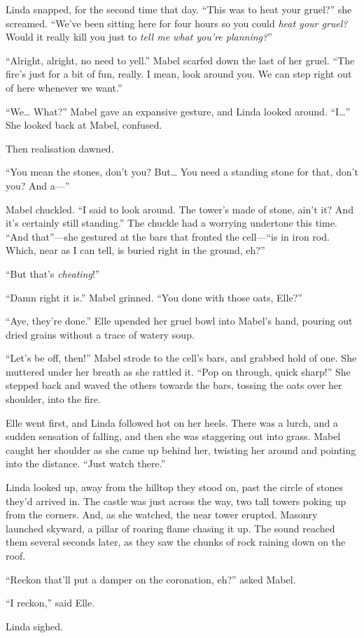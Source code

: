 Linda snapped, for the second time that day.
``This was to heat your gruel?'' she screamed.
``We've been sitting here for four hours so you could \emph{heat your gruel?}
Would it really kill you just to \emph{tell me what you're planning?}''

``Alright, alright, no need to yell.''
Mabel scarfed down the last of her gruel.
``The fire's just for a bit of fun, really.
I mean, look around you.
We can step right out of here whenever we want.''

``We{\dots}
What?''
Mabel gave an expansive gesture, and Linda looked around.
``I{\dots}''
She looked back at Mabel, confused.


Then realisation dawned.

``You mean the stones, don't you?
But{\dots}
You need a standing stone for that, don't you?
And a---''

Mabel chuckled.
``I said to look around.
The tower's made of stone, ain't it?
And it's certainly still standing.''
The chuckle had a worrying undertone this time.
``And that''---she gestured at the bars that fronted the cell---``is in iron rod.
Which, near as I can tell, is buried right in the ground, eh?''

``But that's \emph{cheating}!''

``Damn right it is.''
Mabel grinned.
``You done with those oats, Elle?''

``Aye, they're done.''
Elle upended her gruel bowl into Mabel's hand, pouring out dried grains without a trace of watery soup.

``Let's be off, then!''
Mabel strode to the cell's bars, and grabbed hold of one.
She muttered under her breath as she rattled it.
``Pop on through, quick sharp!''
She stepped back and waved the others towards the bars, tossing the oats over her shoulder, into the fire.

Elle went first, and Linda followed hot on her heels.
There was a lurch, and a sudden sensation of falling, and then she was staggering out into grass.
Mabel caught her shoulder as she came up behind her, twisting her around and pointing into the distance.
``Just watch there.''

Linda looked up, away from the hilltop they stood on, past the circle of stones they'd arrived in.
The castle was just across the way, two tall towers poking up from the corners.
And, as she watched, the near tower erupted.
Masonry launched skyward, a pillar of roaring flame chasing it up.
The sound reached them several seconds later, as they saw the chunks of rock raining down on the roof.

``Reckon that'll put a damper on the coronation, eh?'' asked Mabel.

``I reckon,'' said Elle.

Linda sighed.
